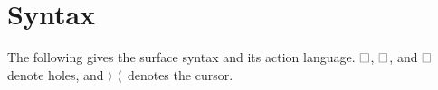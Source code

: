 \documentclass[11pt]{article}
\begin{document}
\section{Syntax}
The following gives the surface syntax and its action language. \(\THole\), \(\EHole\), and \(\BHole\)
denote holes, and \(\Cursor{\ }\) denotes the cursor.

\begin{grammar}
  \syntax{\Typ}{\forms
    {\THole}
    {\TUnknown}
    {\TNum}
    {\TArrow{\Typ}{\Typ}}
  }
  \syntax{\ZTyp}{\forms
    {\ZTCursor{\Typ}}
    {\ZTArrowL{\ZTyp}{\Typ}}
    {\ZTArrowR{\Typ}{\ZTyp}}
  }
  \syntax{\ZExp}{\forms
    {\ZECursor{\Exp}}
    {\ZELamB{\ZBnd}{\Typ}{\Exp}}
    {\ZELamT{\Bnd}{\ZTyp}{\Exp}}
    {\ZELamE{\Bnd}{\Typ}{\ZExp}}
    {\ZEApL{\ZExp}{\Exp}}
    {\ZEApR{\Exp}{\ZExp}}
    {\ZEPlusL{\ZExp}{\Exp}}
    {\ZEPlusR{\Exp}{\ZExp}}
  }
  \syntax{\ZBnd}{\forms
    {\ZBCursor{\Bnd}}
  }
  \syntax{\Act}{\forms
    {\AMove{\Move}}
    {\AWrap{\Ctor}}
    {\ADel}
  }
  \syntax{\Move}{\forms
    {\MIn{\IndexI}}
    {\MOut}
  }
  \syntax{\Ctor}{\forms
    {\CtorT}
    {\CtorE}
    {\CtorB}
  }
  \syntax{\CtorT}{\forms
    {\CTUnknown}
    {\CTNum}
    {\CTArrowL}
    {\CTArrowR}
  }
\end{grammar}

%
%
%
\end{document}
